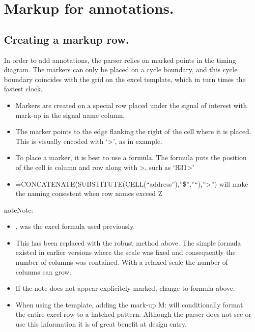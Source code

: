 \documentclass[letterpaper,10pt,english]{sphinxmanual}
\begin{document}
\section{Markup for annotations.}
\label{\detokenize{step_by_step:markup-for-annotations}}

\subsection{Creating a markup row.}
\label{\detokenize{step_by_step:creating-a-markup-row}}
In order to add annotations, the parser relies on marked points in the timing
diagram.  The markers can only be placed on a cycle boundary, and this cycle
boundary coincides with the grid on the excel template, which in turn times the
fastest clock.
\begin{itemize}
\item {} 
Markers are created on a special row placed under the signal of interest with
mark-up  in the signal name column.

\item {} 
The marker points to the edge
flanking the right of the cell where it is placed. This is visually encoded
with ‘\textgreater{}’, as in example.

\item {} 
To place a marker, it is best to use a formula. The formula puts the position
of the cell ie column and row along with \textgreater{}, such as ‘H31\textgreater{}’

\item {} 
=CONCATENATE(SUBSTITUTE(CELL(“address”),”\$”,”“),”\textgreater{}”) will make the naming consistent when row names exceed Z

\end{itemize}

\begin{sphinxadmonition}{note}{Note:}\begin{itemize}
\item {} 
, was the excel formula used previously.

\item {} 
This has been replaced with the robust method above. The simple formula existed in  earlier versions where the scale was fixed and consequently the number of columns was contained. With a relaxed scale the number of columns can grow.

\item {} 
If the note does not appear explicitely marked, change to formula above.

\item {} 
When using the template, adding the mark-up M: will conditionally format the
entire excel row to a hatched pattern. Although the parser does not see or use
this information it is of great benefit at design entry.

\end{itemize}
\end{sphinxadmonition}
\end{document}
